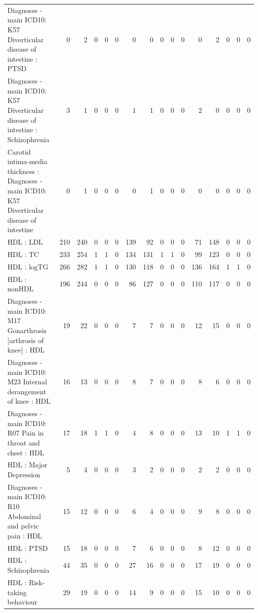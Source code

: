 \begin{table}[ht]
\begin{tabular}{lrrrrrrrrrrrrrrr}
  Diagnoses - main ICD10: K57 Diverticular disease of intestine : PTSD &   0 &   2 &   0 &   0 &   0 &   0 &   0 &   0 &   0 &   0 &   0 &   2 &   0 &   0 &   0 \\ 
  Diagnoses - main ICD10: K57 Diverticular disease of intestine : Schizophrenia &   3 &   1 &   0 &   0 &   0 &   1 &   1 &   0 &   0 &   0 &   2 &   0 &   0 &   0 &   0 \\ 
  Carotid intima-media thickness : Diagnoses - main ICD10: K57 Diverticular disease of intestine &   0 &   1 &   0 &   0 &   0 &   0 &   1 &   0 &   0 &   0 &   0 &   0 &   0 &   0 &   0 \\ 
  HDL : LDL & 210 & 240 &   0 &   0 &   0 & 139 &  92 &   0 &   0 &   0 &  71 & 148 &   0 &   0 &   0 \\ 
  HDL : TC & 233 & 254 &   1 &   1 &   0 & 134 & 131 &   1 &   1 &   0 &  99 & 123 &   0 &   0 &   0 \\ 
  HDL : logTG & 266 & 282 &   1 &   1 &   0 & 130 & 118 &   0 &   0 &   0 & 136 & 164 &   1 &   1 &   0 \\ 
  HDL : nonHDL & 196 & 244 &   0 &   0 &   0 &  86 & 127 &   0 &   0 &   0 & 110 & 117 &   0 &   0 &   0 \\ 
  Diagnoses - main ICD10: M17 Gonarthrosis [arthrosis of knee] : HDL &  19 &  22 &   0 &   0 &   0 &   7 &   7 &   0 &   0 &   0 &  12 &  15 &   0 &   0 &   0 \\ 
  Diagnoses - main ICD10: M23 Internal derangement of knee : HDL &  16 &  13 &   0 &   0 &   0 &   8 &   7 &   0 &   0 &   0 &   8 &   6 &   0 &   0 &   0 \\ 
  Diagnoses - main ICD10: R07 Pain in throat and chest : HDL &  17 &  18 &   1 &   1 &   0 &   4 &   8 &   0 &   0 &   0 &  13 &  10 &   1 &   1 &   0 \\ 
  HDL : Major Depression &   5 &   4 &   0 &   0 &   0 &   3 &   2 &   0 &   0 &   0 &   2 &   2 &   0 &   0 &   0 \\ 
  Diagnoses - main ICD10: R10 Abdominal and pelvic pain : HDL &  15 &  12 &   0 &   0 &   0 &   6 &   4 &   0 &   0 &   0 &   9 &   8 &   0 &   0 &   0 \\ 
  HDL : PTSD &  15 &  18 &   0 &   0 &   0 &   7 &   6 &   0 &   0 &   0 &   8 &  12 &   0 &   0 &   0 \\ 
  HDL : Schizophrenia &  44 &  35 &   0 &   0 &   0 &  27 &  16 &   0 &   0 &   0 &  17 &  19 &   0 &   0 &   0 \\ 
  HDL : Risk-taking behaviour &  29 &  19 &   0 &   0 &   0 &  14 &   9 &   0 &   0 &   0 &  15 &  10 &   0 &   0 &   0 \\ 

\end{tabular}
\end{table}
